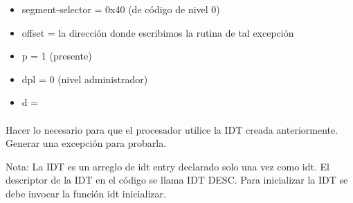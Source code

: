 \begin{itemize}
    \item segment-selector = 0x40 (de código de nivel 0)
    \item offset = la dirección donde escribimos la rutina de tal excepción
    \item p = 1 (presente)
    \item dpl = 0 (nivel administrador)
    \item d = 
\end{itemize}

\paragraph{}\label{subsubsec:ej2-b}
Hacer lo necesario para que el procesador utilice la IDT creada anteriormente.
Generar una excepción para probarla.

Nota: La IDT es un arreglo de idt entry declarado solo una vez como idt. El
descriptor de la IDT en el código se llama IDT DESC. Para inicializar la IDT se
debe invocar la función idt inicializar.
\hruler
{}

